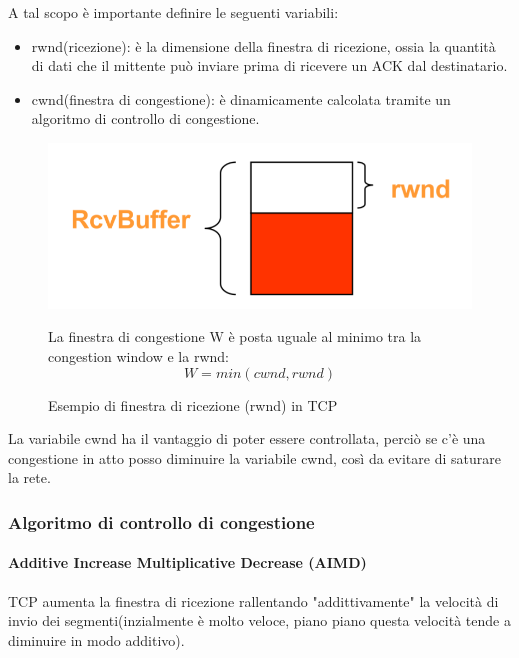 A tal scopo è importante definire le seguenti variabili:
\begin{itemize}
    \item rwnd(ricezione): è la dimensione della finestra di ricezione, ossia la quantità di dati che il mittente può inviare prima di ricevere un ACK dal destinatario.  
    \item cwnd(finestra di congestione): è dinamicamente calcolata tramite un algoritmo di controllo di congestione. 
\end{itemize}
\begin{figure}[h!]
    \begin{minipage}{0.45\textwidth}
        \centering
        \includegraphics[width=\textwidth]{images/rwnd.png}
        \caption{Esempio di finestra di ricezione (rwnd) in TCP}
        \label{fig:rwnd}
    \end{minipage}
    \hfill
    \begin{minipage}{0.52\textwidth}
        \raggedright
        La finestra di congestione W è posta uguale al minimo tra la congestion window e la rwnd:
        \begin{equation}
            W = min(cwnd, rwnd)
        \end{equation}
        \raggedleft
    \end{minipage}
\end{figure}

La variabile cwnd ha il vantaggio di poter essere controllata, perciò se c'è una congestione in atto posso diminuire la variabile cwnd, così da evitare di saturare la rete.

\subsubsection{Algoritmo di controllo di congestione}

\paragraph{Additive Increase Multiplicative Decrease (AIMD)}
TCP aumenta la finestra di ricezione rallentando "addittivamente" la velocità di invio dei segmenti(inzialmente è molto veloce, piano piano questa velocità tende a diminuire in modo additivo). 

